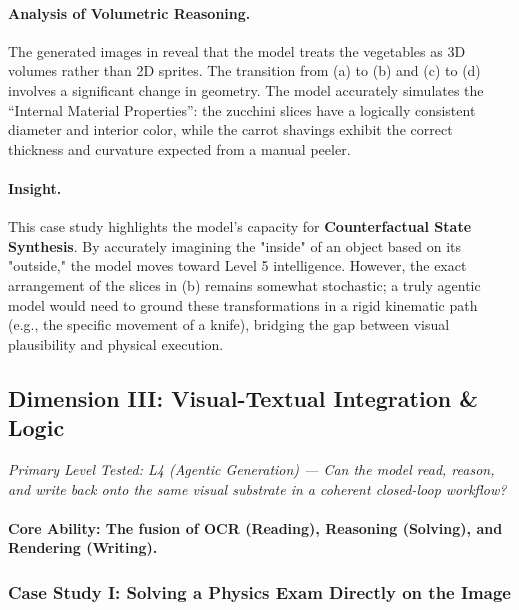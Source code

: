 \paragraph{Analysis of Volumetric Reasoning.}
The generated images in  reveal that the model treats the vegetables as 3D volumes rather than 2D sprites. The transition from (a) to (b) and (c) to (d) involves a significant change in geometry. The model accurately simulates the ``Internal Material Properties'': the zucchini slices have a logically consistent diameter and interior color, while the carrot shavings exhibit the correct thickness and curvature expected from a manual peeler.

\paragraph{Insight.}
This case study highlights the model's capacity for \textbf{Counterfactual State Synthesis}. By accurately imagining the "inside" of an object based on its "outside," the model moves toward Level 5 intelligence. However, the exact arrangement of the slices in (b) remains somewhat stochastic; a truly agentic model would need to ground these transformations in a rigid kinematic path (e.g., the specific movement of a knife), bridging the gap between visual plausibility and physical execution.


\subsection{Dimension III: Visual-Textual Integration \& Logic}

\noindent\textit{Primary Level Tested: L4 (Agentic Generation) --- Can the model read, reason, and write back onto the same visual substrate in a coherent closed-loop workflow?}

\paragraph{Core Ability: The fusion of OCR (Reading), Reasoning (Solving), and Rendering (Writing).}

\subsubsection{Case Study I: Solving a Physics Exam Directly on the Image}
\label{subsubsec:physics_solver_case}

